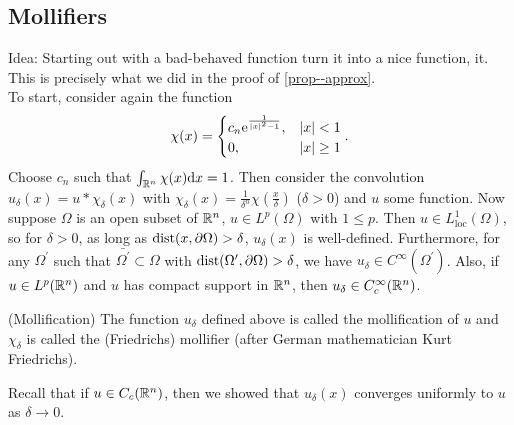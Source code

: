 \documentclass[11pt]{article}
\begin{document}
		\subsection{Mollifiers}

			\noindent Idea: Starting out with a bad-behaved function turn it into a nice function,  it. This is precisely what we did in the proof of \autoref{prop--approx}.
			\\

			\noindent To start, consider again the function
			\begin{equation*}
				\chi(x)=\begin{cases}
					c_n\mathrm{e}^{\frac{1}{|x|^2-1}}, & |x|<1\\
					0, & |x|\ge1
				\end{cases}.
			\end{equation*}
			Choose $c_n$ such that $\int_{\mathbb{R}^n}\chi(x)\mathrm{d}x=1$. Then consider the convolution $u_\delta(x)=u\ast\chi_\delta(x)$ with $\chi_\delta(x)=\frac{1}{\delta^n}\chi(\frac{x}{\delta})$ ($\delta>0$) and $u$ some function. Now suppose $\Omega$ is an open subset of $\mathbb{R}^n$, $u\in L^p(\Omega)$ with $1\le p$. Then $u\in L^1_\mathrm{loc}(\Omega)$, so for $\delta>0$, as long as $\operatorname{dist}(x,\partial\Omega)>\delta$, $u_\delta(x)$ is well-defined. Furthermore, for any $\Omega^\prime$ such that $\bar{\Omega^\prime}\subset\Omega$ with $\operatorname{dist}(\Omega^\prime,\partial\Omega)>\delta$, we have $u_\delta\in C^\infty(\Omega^\prime)$. Also, if $u\in L^p(\mathbb{R}^n)$ and $u$ has compact support in $\mathbb{R}^n$, then $u_\delta\in C^\infty_c(\mathbb{R}^n)$.
			
			\begin{defi}
				(Mollification) The function $u_\delta$ defined above is called the mollification of $u$ and $\chi_\delta$ is called the (Friedrichs) mollifier (after German mathematician Kurt Friedrichs).
			\end{defi}

			Recall that if $u\in C_c(\mathbb{R}^n)$, then we showed that $u_\delta(x)$ converges uniformly to $u$ as $\delta\rightarrow0$.
\end{document}

